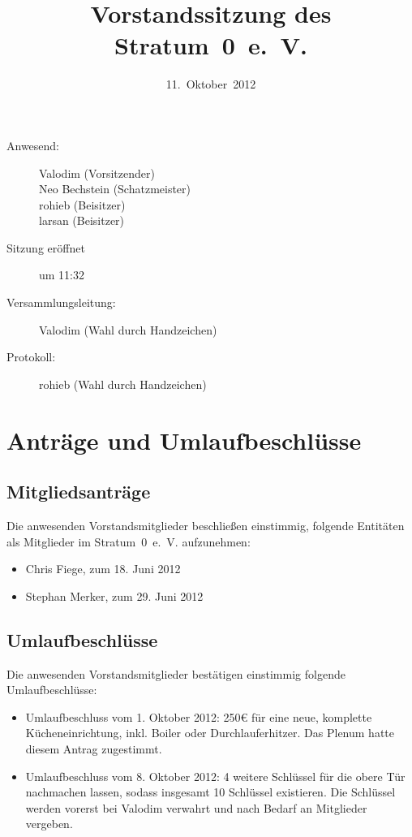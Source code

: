 \documentclass[a4paper,12pt]{scrartcl}
\title{Vorstandssitzung des Stratum~0~e.~V.}
\date{11.~Oktober~2012}
\begin{document}
\maketitle
\tableofcontents

\begin{description}
 \item[Anwesend:] Valodim (Vorsitzender) \\
    Neo Bechstein (Schatzmeister) \\
    rohieb (Beisitzer) \\
    larsan (Beisitzer)
  \item[Sitzung eröffnet] um 11:32
  \item[Versammlungsleitung:] Valodim (Wahl durch Handzeichen)
  \item[Protokoll:] rohieb (Wahl durch Handzeichen)
\end{description}

\section{Anträge und Umlaufbeschlüsse}
\subsection{Mitgliedsanträge}
Die anwesenden Vorstandsmitglieder beschließen einstimmig, folgende Entitäten
als Mitglieder im Stratum~0~e.~V. aufzunehmen:
\begin{itemize}
	\item Chris Fiege, zum 18. Juni 2012
	\item Stephan Merker, zum 29. Juni 2012
\end{itemize}

\subsection{Umlaufbeschlüsse}
Die anwesenden Vorstandsmitglieder bestätigen einstimmig folgende
Umlaufbeschlüsse:
\begin{itemize}
	\item Umlaufbeschluss vom 1. Oktober 2012: 250€ für eine neue, komplette
		Kücheneinrichtung, inkl. Boiler oder Durchlauferhitzer. Das Plenum hatte
		diesem Antrag zugestimmt.
	\item Umlaufbeschluss vom 8. Oktober 2012: 4 weitere Schlüssel für die obere
		Tür nachmachen lassen, sodass insgesamt 10 Schlüssel existieren. Die
		Schlüssel werden vorerst bei Valodim verwahrt und nach Bedarf an Mitglieder
		vergeben.
\end{itemize}
\end{document}
